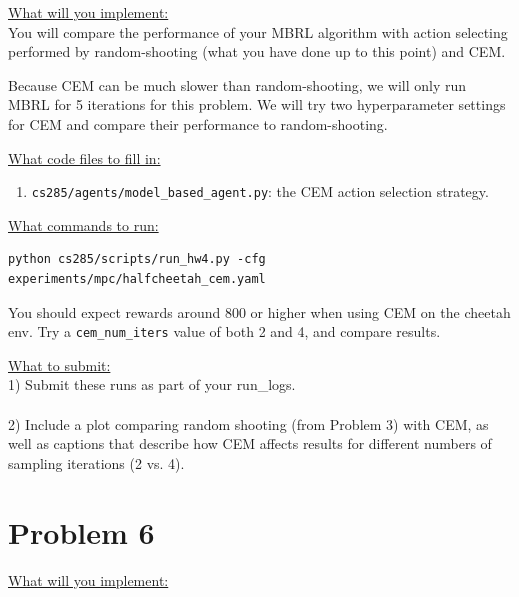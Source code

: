\documentclass{article} %
\begin{document}
\underline{What will you implement:}\\ 
You will compare the performance of your MBRL algorithm with action selecting performed by random-shooting (what you have done up to this point) and CEM.

Because CEM can be much slower than random-shooting, we will only run MBRL for 5 iterations for this problem. We will try two hyperparameter settings for CEM and compare their performance to random-shooting.

\underline{What code files to fill in:}
\begin{enumerate}
    \item \verb+cs285/agents/model_based_agent.py+: the CEM action selection strategy.
\end{enumerate}

\underline{What commands to run:}\\
\begin{lstlisting}[escapechar=@]
python cs285/scripts/run_hw4.py -cfg experiments/mpc/halfcheetah_cem.yaml
\end{lstlisting}

You should expect rewards around 800 or higher when using CEM on the cheetah env. Try a \verb+cem_num_iters+ value of both 2 and 4, and compare results.

\underline{What to submit:}\\
1) Submit these runs as part of your run\_logs.\\ \\
2) Include a plot comparing random shooting (from Problem 3) with CEM, as well as captions that describe how CEM affects results for different numbers of sampling iterations (2 vs. 4).


\newpage
\section*{Problem 6}

\underline{What will you implement:}\\ 
\end{document}
